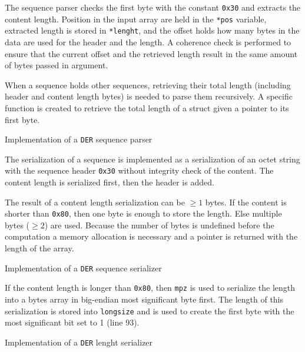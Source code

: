 The sequence parser checks the first byte with the constant \texttt{0x30} and
extracts the content length. Position in the input array are held in the
\texttt{*pos} variable, extracted length is stored in \texttt{*lenght}, and the
offset holds how many bytes in the data are used for the header and the length.
A coherence check is performed to ensure that the current offset and the
retrieved length result in the same amount of bytes passed in argument.

When a sequence holds other sequences, retrieving their total length (including
header and content length bytes) is needed to parse them recursively. A specific
function is created to retrieve the total length of a struct given a pointer to
its first byte.

\begin{listing}
	\caption{Implementation of a \texttt{DER} sequence parser}
	\label{lst:implDERSequenceParser}
\end{listing}

The serialization of a sequence is implemented as a serialization of an octet
string with the sequence header \texttt{0x30} without integrity check of the
content. The content length is serialized first, then the header is added.

The result of a content length serialization can be $\geq 1$ bytes. If the
content is shorter than \texttt{0x80}, then one byte is enough to store the
length. Else multiple bytes ($\geq 2$) are used. Because the number of bytes is
undefined before the computation a memory allocation is necessary and a pointer
is returned with the length of the array.

\begin{listing}
	\caption{Implementation of a \texttt{DER} sequence serializer}
	\label{lst:implDERSequenceSerializer}
\end{listing}

If the content length is longer than \texttt{0x80}, then \texttt{mpz} is used to
serialize the length into a bytes array in big-endian most significant byte
first. The length of this serialization is stored into \texttt{longsize} and is
used to create the first byte with the most significant bit set to 1 (line 93).

\begin{listing}
	\caption{Implementation of a \texttt{DER} lenght serializer}
	\label{lst:implDERLenghtSerializer}
\end{listing}

